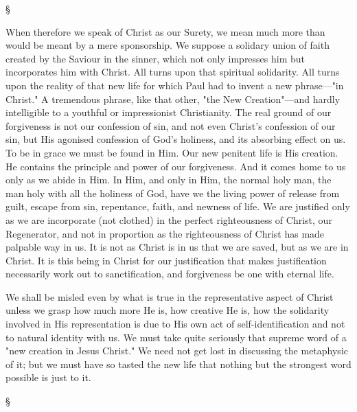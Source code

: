 \documentclass[12pt,a5paper,twoside,titlepage]{book}
\begin{document}
\begin{center}
\S
\end{center}

When therefore we speak of Christ as our 
Surety, we mean much more than would be 
meant by a mere sponsorship. We suppose a 
solidary union of faith created by the Saviour in 
the sinner, which not only impresses him but 
incorporates him with Christ. All turns upon 
that spiritual solidarity. All turns upon the 
reality of that new life for which Paul had to 
invent a new phrase---"in Christ." A tremendous 
phrase, like that other, "the New Creation"---and 
hardly intelligible to a youthful or impressionist 
Christianity. The real ground of our forgiveness 
is not our confession of sin, and not even 
Christ's confession of our sin, but His agonised 
confession of God's holiness, and its absorbing 
effect on us. To be in grace we must be 
found in Him. Our new penitent life is His 
creation. He contains the principle and power 
of our forgiveness. And it comes home to us 
only as we abide in Him. In Him, and only 
in Him, the normal holy man, the man holy 
with all the holiness of God, have we the 
living power of release from guilt, escape from 
sin, repentance, faith, and newness of life. 
We are justified only as we are incorporate 
(not clothed) in the perfect righteousness of 
Christ, our Regenerator, and not in proportion as the righteousness of Christ has made 
palpable way in us. It is not as Christ is in 
us that we are saved, but as we are in Christ. 
It is this being in Christ for our justification 
that makes justification necessarily work out 
to sanctification, and forgiveness be one with 
eternal life. 

We shall be misled even by what is true in the 
representative aspect of Christ unless we grasp 
how much more He is, how creative He is, how 
the solidarity involved in His representation is 
due to His own act of self-identification and 
not to natural identity with us. We must take 
quite seriously that supreme word of a "new 
creation in Jesus Christ." We need not get 
lost in discussing the metaphysic of it; but 
we must have so tasted the new life that 
nothing but the strongest word possible is just 
to it. 

\begin{center}
\S
\end{center}
\end{document}
